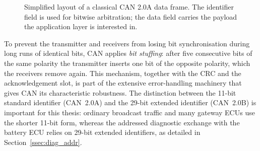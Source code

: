 \documentclass[11pt,a4paper,oneside,parskip=half]{scrreprt}
\begin{document}
\begin{figure}[H]
\centering
{}
\caption{Simplified layout of a classical CAN 2.0A data frame. The identifier field is used for bitwise arbitration; the data field carries the payload the application layer is interested in.}
\label{fig:can_frame}
\end{figure}

To prevent the transmitter and receivers from losing bit synchronisation during long runs of identical bits, CAN applies \textit{bit stuffing}: after five consecutive bits of the same polarity the transmitter inserts one bit of the opposite polarity, which the receivers remove again. This mechanism, together with the CRC and the acknowledgement slot, is part of the extensive error-handling machinery that gives CAN its characteristic robustness. The distinction between the 11-bit standard identifier (CAN~2.0A) and the 29-bit extended identifier (CAN~2.0B) is important for this thesis: ordinary broadcast traffic and many gateway ECUs use the shorter 11-bit form, whereas the addressed diagnostic exchange with the battery ECU relies on 29-bit extended identifiers, as detailed in Section~\ref{ssec:diag_addr}.
\end{document}

